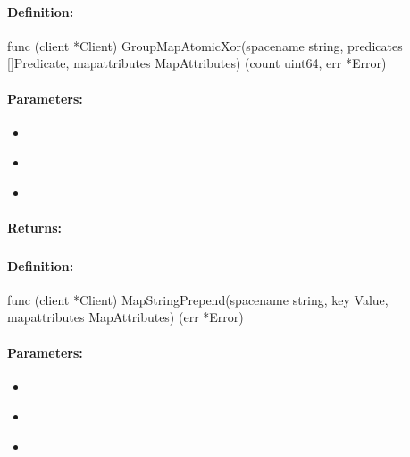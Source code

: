 \paragraph{Definition:}
\begin{gocode}
func (client *Client) GroupMapAtomicXor(spacename string, predicates []Predicate, mapattributes MapAttributes) (count uint64, err *Error)
\end{gocode}

\paragraph{Parameters:}
\begin{itemize}[noitemsep]
\item {}\\

\item {}\\

\item {}\\

\end{itemize}

\paragraph{Returns:}


\pagebreak
\subsubsection{}
\label{api:Go:MapStringPrepend}


\paragraph{Definition:}
\begin{gocode}
func (client *Client) MapStringPrepend(spacename string, key Value, mapattributes MapAttributes) (err *Error)
\end{gocode}

\paragraph{Parameters:}
\begin{itemize}[noitemsep]
\item {}\\

\item {}\\

\item {}\\

\end{itemize}

